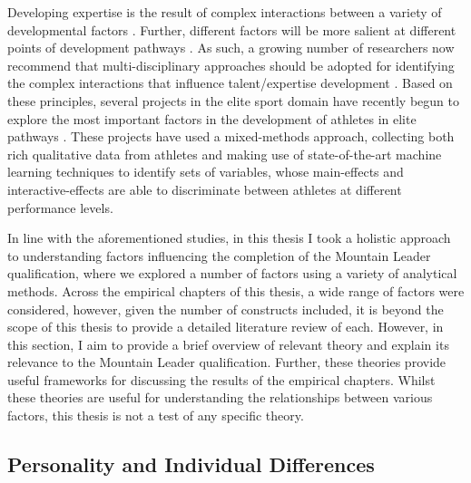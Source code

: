 \documentclass[
  12pt,
  a4paper,
]{book}
\begin{document}
Developing expertise is the result of complex interactions between a variety of developmental factors \citep[e.g., practice and training, personality traits, motivation, social support to name but a few;][]{Baker2013, Gagne2004, Johnston2018}. Further, different factors will be more salient at different points of development pathways \citep{Rees2016}. As such, a growing number of researchers now recommend that multi-disciplinary approaches should be adopted for identifying the complex interactions that influence talent/expertise development \citep[e.g.,][]{Abernethy2013, Gullich2019, Johnston2018, Pearson2006, Rees2016, Schorer2013}. Based on these principles, several projects in the elite sport domain have recently begun to explore the most important factors in the development of athletes in elite pathways \citep[e.g.,][]{Gullich2019, Hardy2017, Jones2019a, Jones2019b, Jones2020, Rees2016}. These projects have used a mixed-methods approach, collecting both rich qualitative data from athletes and making use of state-of-the-art machine learning techniques to identify sets of variables, whose main-effects and interactive-effects are able to discriminate between athletes at different performance levels.

In line with the aforementioned studies, in this thesis I took a holistic approach to understanding factors influencing the completion of the Mountain Leader qualification, where we explored a number of factors using a variety of analytical methods. Across the empirical chapters of this thesis, a wide range of factors were considered, however, given the number of constructs included, it is beyond the scope of this thesis to provide a detailed literature review of each. However, in this section, I aim to provide a brief overview of relevant theory and explain its relevance to the Mountain Leader qualification. Further, these theories provide useful frameworks for discussing the results of the empirical chapters. Whilst these theories are useful for understanding the relationships between various factors, this thesis is not a test of any specific theory.

\hypertarget{gen-intro-paid}{%
\subsection{Personality and Individual Differences}\label{gen-intro-paid}}
\end{document}
